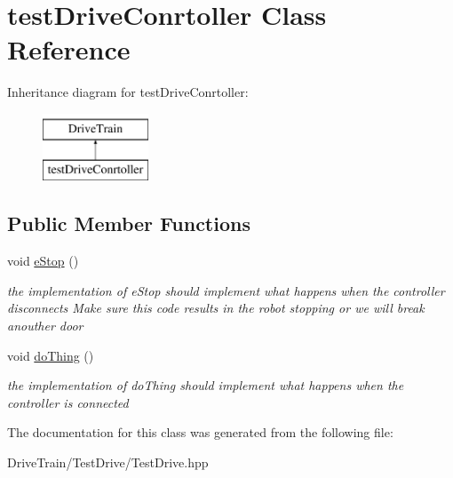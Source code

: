 \hypertarget{classtest_drive_conrtoller}{}\section{test\+Drive\+Conrtoller Class Reference}
\label{classtest_drive_conrtoller}
Inheritance diagram for test\+Drive\+Conrtoller\+:\begin{figure}[H]
\begin{center}
\leavevmode
\includegraphics[height=2.000000cm]{classtest_drive_conrtoller}
\end{center}
\end{figure}
\subsection*{Public Member Functions}
\begin{DoxyCompactItemize}
\item 
\mbox{\label{classtest_drive_conrtoller_ab2b6333c390e7b5f5988cf97c3fbaf0d}} 
void \mbox{\hyperlink{classtest_drive_conrtoller_ab2b6333c390e7b5f5988cf97c3fbaf0d}{e\+Stop}} ()
\begin{DoxyCompactList}\small\item\em the implementation of e\+Stop should implement what happens when the controller disconnects Make sure this code results in the robot stopping or we will break anouther door \end{DoxyCompactList}\item 
\mbox{\label{classtest_drive_conrtoller_ae093990e6c81832e1c5ba326c29dc1c8}} 
void \mbox{\hyperlink{classtest_drive_conrtoller_ae093990e6c81832e1c5ba326c29dc1c8}{do\+Thing}} ()
\begin{DoxyCompactList}\small\item\em the implementation of do\+Thing should implement what happens when the controller is connected \end{DoxyCompactList}\end{DoxyCompactItemize}


The documentation for this class was generated from the following file\+:\begin{DoxyCompactItemize}
\item 
Drive\+Train/\+Test\+Drive/Test\+Drive.\+hpp\end{DoxyCompactItemize}
